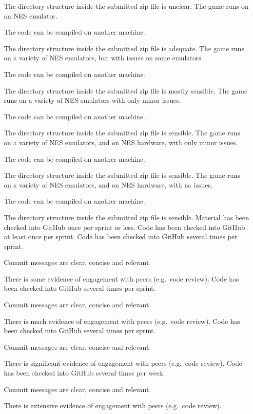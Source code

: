 \documentclass{../../fal_assignment}
\begin{document}
\begin{markingrubric}
            \par The directory structure inside the submitted zip file is unclear.
        \grade The game runs on an NES emulator.
        	\par The code can be compiled on another machine.
            \par The directory structure inside the submitted zip file is adequate.
        \grade The game runs on a variety of NES emulators, but with issues on some emulators.
        	\par The code can be compiled on another machine.
            \par The directory structure inside the submitted zip file is mostly sensible.
        \grade The game runs on a variety of NES emulators with only minor issues.
        	\par The code can be compiled on another machine.
            \par The directory structure inside the submitted zip file is sensible.
        \grade The game runs on a variety of NES emulators, and on NES hardware, with only minor issues.
        	\par The code can be compiled on another machine.
            \par The directory structure inside the submitted zip file is sensible.
        \grade The game runs on a variety of NES emulators, and on NES hardware, with no issues.
        	\par The code can be compiled on another machine.
            \par The directory structure inside the submitted zip file is sensible.
%
        \grade \fail Material has been checked into GitHub once per sprint or less.
        \grade Code has been checked into GitHub at least once per sprint.
        \grade Code has been checked into GitHub several times per sprint.
            \par Commit messages are clear, concise and relevant.
            \par There is some evidence of engagement with peers (e.g.\ code review).
        \grade Code has been checked into GitHub several times per sprint.
            \par Commit messages are clear, concise and relevant.
            \par There is much evidence of engagement with peers (e.g.\ code review).
        \grade Code has been checked into GitHub several times per sprint.
            \par Commit messages are clear, concise and relevant.
            \par There is significant evidence of engagement with peers (e.g.\ code review).
        \grade Code has been checked into GitHub several times per week.
            \par Commit messages are clear, concise and relevant.
            \par There is extensive evidence of engagement with peers (e.g.\ code review).
\end{markingrubric}
\end{document}
